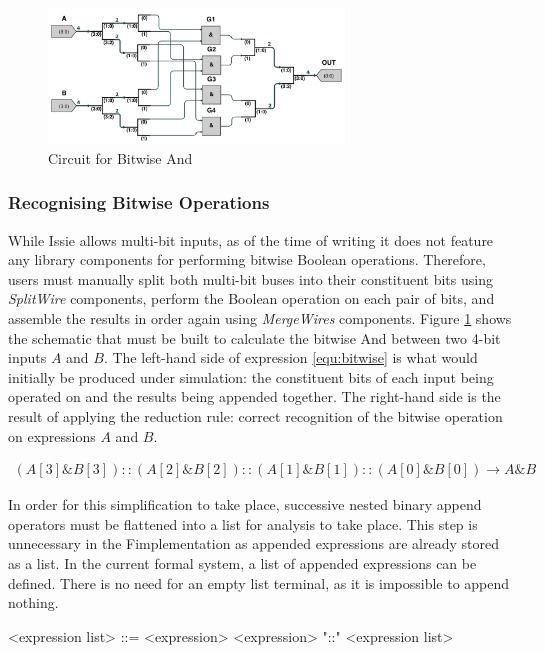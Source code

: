 \begin{figure}
    \centering
    \includegraphics[width=0.7\textwidth]{05.ImpPlan/bitwise.png}
    \caption{Circuit for Bitwise And}
    \label{fig:bitwiseand}
\end{figure}

\subsubsection{Recognising Bitwise Operations}
While Issie allows multi-bit inputs, as of the time of writing it does not feature any library components for performing bitwise Boolean operations. Therefore, users must manually split both multi-bit buses into their constituent bits using \textit{SplitWire} components, perform the Boolean operation on each pair of bits, and assemble the results in order again using \textit{MergeWires} components. Figure \ref{fig:bitwiseand} shows the schematic that must be built to calculate the bitwise And between two 4-bit inputs $A$ and $B$. The left-hand side of expression \ref{equ:bitwise} is what would initially be produced under simulation: the constituent bits of each input being operated on and the results being appended together. The right-hand side is the result of applying the reduction rule: correct recognition of the bitwise operation on expressions $A$ and $B$.

\begin{align} \label{equ:bitwise}
    (A[3] \& B[3]) :: (A[2] \& B[2]) :: (A[1] \& B[1]) :: (A[0] \& B[0]) \rightarrow A \& B
\end{align}

In order for this simplification to take place, successive nested binary append operators must be flattened into a list for analysis to take place. This step is unnecessary in the F\fsharp implementation as appended expressions are already stored as a list. In the current formal system, a list of appended expressions can be defined. There is no need for an empty list terminal, as it is impossible to append nothing.
\setlength{\grammarindent}{4.5cm}
\begin{grammar}
    <expression list> ::= <expression> \alt <expression> "::" <expression list>
\end{grammar}

